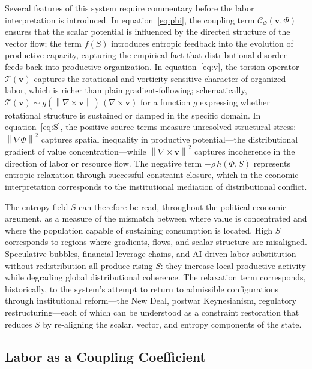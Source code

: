 \documentclass[11pt, a4paper]{article}
\theoremstyle{plain}
\theoremstyle{definition}
\newcommand{\Phifield}{\Phi}
\newcommand{\vfield}{\mathbf{v}}
\newcommand{\Sfield}{S}
\newcommand{\norm}[1]{\left\lVert #1 \right\rVert}
\begin{document}
Several features of this system require commentary before the labor
interpretation is introduced. In equation~\eqref{eq:phi}, the coupling term
$\mathcal{C}_\Phi(\vfield, \Phifield)$ ensures that the scalar potential is
influenced by the directed structure of the vector flow; the term $f(\Sfield)$
introduces entropic feedback into the evolution of productive capacity,
capturing the empirical fact that distributional disorder feeds back into
productive organization. In equation~\eqref{eq:v}, the torsion operator
$\mathcal{T}(\vfield)$ captures the rotational and vorticity-sensitive character
of organized labor, which is richer than plain gradient-following; schematically,
$\mathcal{T}(\vfield) \sim g(\norm{\nabla \times \vfield})\,(\nabla \times \vfield)$
for a function $g$ expressing whether rotational structure is sustained or
damped in the specific domain. In equation~\eqref{eq:S}, the positive source
terms measure unresolved structural stress: $\norm{\nabla \Phifield}^2$ captures
spatial inequality in productive potential---the distributional gradient of
value concentration---while $\norm{\nabla \times \vfield}^2$ captures incoherence
in the direction of labor or resource flow. The negative term $-\rho\, h(\Phifield, \Sfield)$
represents entropic relaxation through successful constraint closure, which in
the economic interpretation corresponds to the institutional mediation of
distributional conflict.

The entropy field $\Sfield$ can therefore be read, throughout the political
economic argument, as a measure of the mismatch between where value is
concentrated and where the population capable of sustaining consumption is
located. High $\Sfield$ corresponds to regions where gradients, flows, and
scalar structure are misaligned. Speculative bubbles, financial leverage chains,
and AI-driven labor substitution without redistribution all produce rising
$\Sfield$: they increase local productive activity while degrading global
distributional coherence. The relaxation term corresponds, historically, to
the system's attempt to return to admissible configurations through
institutional reform---the New Deal, postwar Keynesianism, regulatory
restructuring---each of which can be understood as a constraint restoration
that reduces $\Sfield$ by re-aligning the scalar, vector, and entropy
components of the state.

\subsection{Labor as a Coupling Coefficient}
\end{document}
